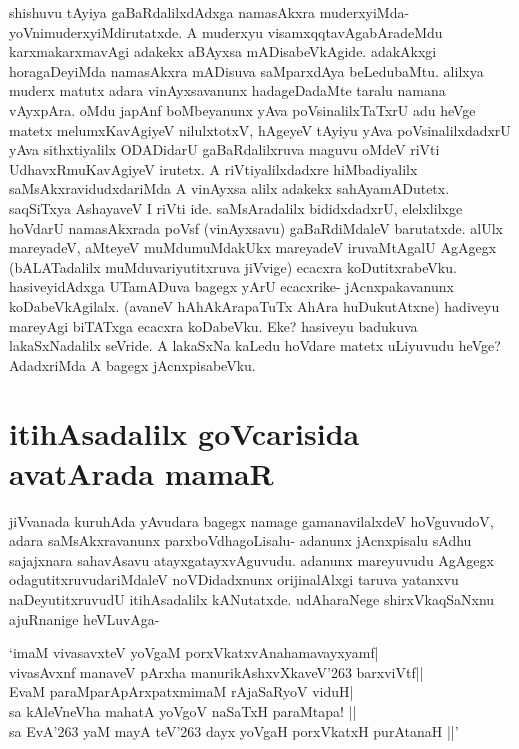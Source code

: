 shishuvu tAyiya gaBaRdalilxdAdxga namasAkxra muderxyiMda- yoVnimuderxyiMdirutatxde. A muderxyu visamxqqtavAgabAradeMdu karxmakarxmavAgi adakekx aBAyxsa mADisabeVkAgide. adakAkxgi horagaDeyiMda namasAkxra mADisuva saMparxdAya beLedubaMtu. alilxya muderx matutx adara vinAyxsavanunx hadageDadaMte taralu namana vAyxpAra. oMdu japAnf boMbeyanunx yAva poVsinalilxTaTxrU adu heVge matetx melumxKavAgiyeV nilulxtotxV, hAgeyeV tAyiyu yAva poVsinalilxdadxrU yAva sithxtiyalilx ODADidarU gaBaRdalilxruva maguvu oMdeV riVti UdhavxRmuKavAgiyeV irutetx. A riVtiyalilxdadxre hiMbadiyalilx saMsAkxravidudxdariMda A vinAyxsa alilx adakekx sahAyamADutetx. saqSiTxya AshayaveV I riVti ide. saMsAradalilx bididxdadxrU, elelxlilxge hoVdarU namasAkxrada poVsf (vinAyxsavu) gaBaRdiMdaleV barutatxde. alUlx mareyadeV, aMteyeV muMdumuMdakUkx mareyadeV iruvaMtAgalU AgAgegx (bALATadalilx muMduvariyutitxruva jiVvige) ecacxra koDutitxrabeVku. hasiveyidAdxga UTamADuva bagegx yArU ecacxrike- jAcnxpakavanunx koDabeVkAgilalx. (avaneV hAhAkArapaTuTx AhAra huDukutAtxne) hadiveyu mareyAgi biTATxga ecacxra koDabeVku. Eke? hasiveyu badukuva lakaSxNadalilx seVride. A lakaSxNa kaLedu hoVdare matetx uLiyuvudu heVge? AdadxriMda A bagegx jAcnxpisabeVku.

\section*{itihAsadalilx goVcarisida avatArada mamaR}

jiVvanada kuruhAda yAvudara bagegx namage gamanavilalxdeV hoVguvudoV, adara saMsAkxravanunx parxboVdhagoLisalu- adanunx jAcnxpisalu sAdhu sajajxnara sahavAsavu atayxgatayxvAguvudu. adanunx mareyuvudu AgAgegx odagutitxruvudariMdaleV noVDidadxnunx orijinalAlxgi taruva yatanxvu naDeyutitxruvudU itihAsadalilx kANutatxde. udAharaNege shirxVkaqSaNxnu ajuRnanige heVLuvAga-

\begin{shloka}
`imaM vivasavxteV yoVgaM porxVkatxvAnahamavayxyamf|\label{90}\\
vivasAvxnf manaveV pArxha manurikAshxvXkaveV\char'263 barxviVtf||\\
EvaM paraMparApArxpatxmimaM rAjaSaRyoV viduH|\\
sa kAleVneVha mahatA yoVgoV naSaTxH paraMtapa! ||\\
sa EvA\char'263 yaM mayA teV\char'263 dayx yoVgaH porxVkatxH purAtanaH ||'
\end{shloka}

